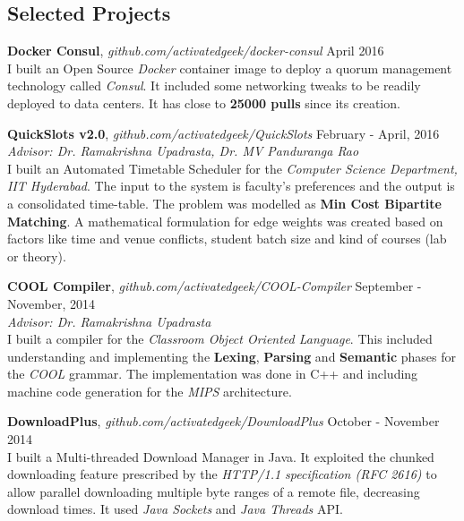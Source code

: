 \documentclass[margin,line]{res}
\begin{document}
\begin{resume}
\section{\sc Selected Projects}

  {\bf Docker Consul}, {\it github.com/activatedgeek/docker-consul} \hfill April 2016 \\
	I built an Open Source {\it Docker} container image to deploy a quorum management technology called {\it Consul}. It included some networking tweaks to be readily deployed to data centers. It has close to {\bf 25000 pulls} since its creation.

  \vspace*{-2.5mm}

  {\bf QuickSlots v2.0}, {\it github.com/activatedgeek/QuickSlots}  \hfill February - April, 2016 \\
  	{\it Advisor: Dr. Ramakrishna Upadrasta, Dr. MV Panduranga Rao} \\
    I built an Automated Timetable Scheduler for the {\it Computer Science Department, IIT Hyderabad}. The input to the system is faculty's preferences and the output is a consolidated time-table. The problem was modelled as {\bf Min Cost Bipartite Matching}. A mathematical formulation for edge weights was created based on factors like time and venue conflicts, student batch size and kind of courses (lab or theory).

  \vspace*{-2.5mm}

  {\bf COOL Compiler}, {\it github.com/activatedgeek/COOL-Compiler} \hfill September - November, 2014 \\
  	{\it Advisor: Dr. Ramakrishna Upadrasta} \\
  	I built a compiler for the {\it Classroom Object Oriented Language}. This included understanding and implementing the {\bf Lexing}, {\bf Parsing} and {\bf Semantic} phases for the {\it COOL} grammar. The implementation was done in C++ and including machine code generation for the {\it MIPS} architecture.

  \vspace*{-2.5mm}

  {\bf DownloadPlus}, {\it github.com/activatedgeek/DownloadPlus} \hfill October - November 2014 \\
  	I built a Multi-threaded Download Manager in Java. It exploited the chunked downloading feature prescribed by the {\it HTTP/1.1 specification (RFC 2616)} to allow parallel downloading multiple byte ranges of a remote file, decreasing download times. It used {\it Java Sockets} and {\it Java Threads} API.


\end{resume}
\end{document}
